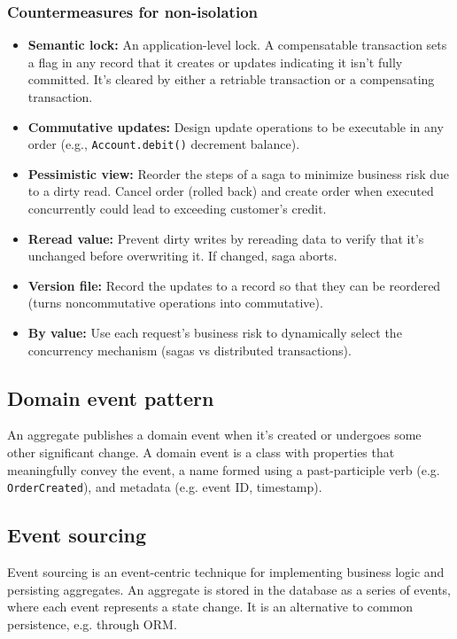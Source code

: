 \subsubsection{Countermeasures for non-isolation}
\begin{itemize}
  \item \textbf{Semantic lock:} An application-level lock. A compensatable transaction sets a flag in any record that it creates or updates indicating it isn't fully committed. It's cleared by either a retriable transaction or a compensating transaction.
  \item \textbf{Commutative updates:} Design update operations to be executable in any order (e.g., \verb|Account.debit()| decrement balance).
  \item \textbf{Pessimistic view:} Reorder the steps of a saga to minimize business risk due to a dirty read.
        Cancel order (rolled back) and create order when executed concurrently could
        lead to exceeding customer's credit.
  \item \textbf{Reread value:} Prevent dirty writes by rereading data to verify that it's unchanged before overwriting it. If changed, saga aborts.
  \item \textbf{Version file:} Record the updates to a record so that they can be reordered (turns noncommutative operations into commutative).
  \item \textbf{By value:} Use each request's business risk to dynamically select the concurrency mechanism (sagas vs distributed transactions).
\end{itemize}

\subsection{Domain event pattern}
An aggregate publishes a domain event when it's created or undergoes some other significant change. A domain event is a class with properties that meaningfully convey the event, a name formed using a past-participle verb (e.g. \verb|OrderCreated|), and metadata (e.g. event ID, timestamp).

\subsection{Event sourcing}
Event sourcing is an event-centric technique for implementing business logic and persisting aggregates. An aggregate is stored in the database as a series of events, where each event represents a state change. It is an alternative to common persistence, e.g. through ORM.

